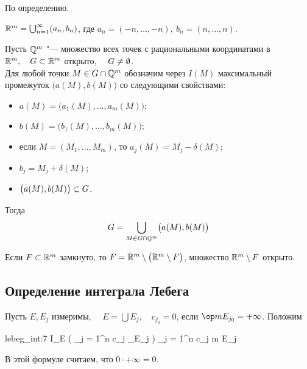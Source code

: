 \begin{eproof}
	\item По определению.

	\item $ \mathbb{R}^m = \bigcup_{n = 1}^\infty (a_n, b_n) $, где $ a_n = (-n, \dots, -n), ~ b_n = (n, \dots, n) $.

	\item Пусть $ \mathbb{Q}^m $ "--- множество всех точек с рациональными координатами в $ \mathbb{R}^m, \quad G \subset \mathbb{R}^m $ открыто, $ \quad G \ne \emptyset $. \\
		Для любой точки $ M \in G \cap \mathbb{Q}^m $ обозначим через $ I(M) $ максимальный промежуток $ \bigl( a(M), b(M) \bigr) $ со следующими свойствами:
		\begin{itemize}
			\item $ a(M) = \bigl( a_1(M), \dots, a_m(M) \bigr) $;
			\item $ b(M) = \bigl( b_1(M), \dots, b_m(M) \bigr) $;
			\item если $ M = (M_1, \dots, M_m) $, то $ a_j(M) = M_j - \delta(M) $;
			\item $ b_j = M_j + \delta(M) $;
			\item $ \bigl( a(M), b(M) \bigr) \subset G $.
		\end{itemize}
		Тогда
		$$ G = \bigcup_{M \in G \cap \mathbb{Q}^m} \bigl( a(M), b(M) \bigr) $$

	\item Если $ F \subset \mathbb{R}^m $ замкнуто, то $ F = \mathbb{R}^m \setminus \bigl( \mathbb{R}^m \setminus F \bigr) $, множество $ \mathbb{R}^m \setminus F $ открыто.
\end{eproof}

\subsection{Определение интеграла Лебега}

\begin{definition}
	Пусть $ E, E_j $ измеримы, $ \quad E = \bigcup E_j, \quad c_{j_0} = 0 $, если $ \op m E_{j_0} = +\infty $.
	Положим
	\begin{equ}{lebeg_int:7}
		I_E \Bigl( \sum_{j = 1}^n c_j \chi_{E_j} \Bigr) \coloneq \sum_{j = 1}^n c_j \op m E_j
	\end{equ}
	В этой формуле считаем, что $ 0 \cdot +\infty = 0 $.
\end{definition}

